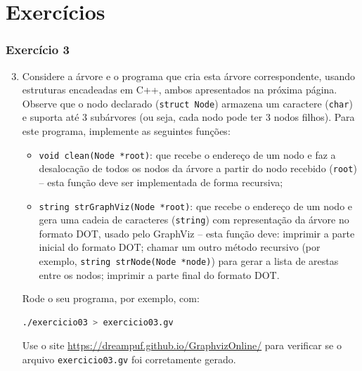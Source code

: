 \documentclass[aspectratio=169]{beamer}
\begin{document}
\section{Exercícios}

\begin{frame}[fragile]\frametitle{Exercício 3}
\begin{enumerate}
        \setcounter{enumi}{2}
	\small
	\item Considere a árvore e o programa que cria esta árvore correspondente, usando estruturas encadeadas em C++, ambos apresentados na próxima página. Observe que o nodo declarado (\texttt{struct Node}) armazena um caractere (\texttt{char}) e suporta até 3 subárvores (ou seja, cada nodo pode ter 3 nodos filhos). Para este programa, implemente as seguintes funções:
	\begin{itemize}
		\footnotesize
		\item \texttt{void clean(Node *root)}: que recebe o endereço de um nodo e faz a desalocação de todos os nodos da árvore a partir do nodo recebido (\texttt{root}) -- esta função deve ser implementada de forma recursiva;
		\item \texttt{string strGraphViz(Node *root)}: que recebe o endereço de um nodo e gera uma cadeia de caracteres (\texttt{string}) com representação da árvore no formato DOT, usado pelo GraphViz -- esta função deve: imprimir a parte inicial do formato DOT; chamar um outro método recursivo (por exemplo, \texttt{string strNode(Node *node)}) para gerar a lista de arestas entre os nodos; imprimir a parte final do formato DOT.
	\end{itemize}
	Rode o seu programa, por exemplo, com:
\begin{lstlisting}[basicstyle=\ttfamily\scriptsize,language=bash]
./exercicio03 > exercicio03.gv
\end{lstlisting}
	Use o site \url{https://dreampuf.github.io/GraphvizOnline/} para verificar se o arquivo \texttt{exercicio03.gv} foi corretamente gerado.
\end{enumerate}
\end{frame}
\end{document}

